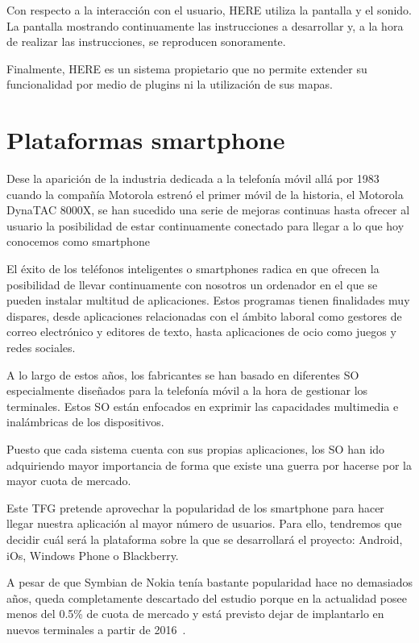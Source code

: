 \begin{definitionlist}
    Con respecto a la interacción con el usuario, HERE utiliza la pantalla y el sonido. La
    pantalla mostrando continuamente las instrucciones a desarrollar y, a la hora de realizar
    las instrucciones, se reproducen sonoramente.

    Finalmente, HERE es un sistema propietario que no permite extender su funcionalidad por medio de
    plugins ni la utilización de sus mapas.

\end{definitionlist}

\section{Plataformas smartphone}

Dese la aparición de la industria dedicada a la telefonía móvil allá por 1983 cuando la compañía
Motorola estrenó el primer móvil de la historia, el Motorola DynaTAC 8000X, se han sucedido una
serie de mejoras continuas hasta ofrecer al usuario la posibilidad de estar continuamente conectado
para llegar a lo que hoy conocemos como smartphone

El éxito de los teléfonos inteligentes o smartphones radica en que ofrecen la posibilidad de llevar
continuamente con nosotros un ordenador en el que se pueden instalar multitud de aplicaciones. Estos
programas tienen finalidades muy dispares, desde aplicaciones relacionadas con el ámbito laboral
como gestores de correo electrónico y editores de texto, hasta aplicaciones de ocio como juegos y
redes sociales.

A lo largo de estos años, los fabricantes se han basado en diferentes \acf{SO} especialmente
diseñados para la telefonía móvil a la hora de gestionar los terminales. Estos \acs{SO} están
enfocados en exprimir las capacidades multimedia e inalámbricas de los dispositivos.

Puesto que cada sistema cuenta con sus propias aplicaciones, los \acs{SO} han ido adquiriendo mayor
importancia de forma que existe una guerra por hacerse por la mayor cuota de mercado.

Este \acs{TFG} pretende aprovechar la popularidad de los smartphone para hacer llegar nuestra
aplicación al mayor número de usuarios. Para ello, tendremos que decidir cuál será la plataforma
sobre la que se desarrollará el proyecto: Android, iOs, Windows Phone o Blackberry.

A pesar de que Symbian de Nokia tenía bastante popularidad hace no demasiados años, queda
completamente descartado del estudio porque en la actualidad posee menos del 0.5\% de cuota de
mercado y está previsto dejar de implantarlo en nuevos terminales a partir de
2016~\cite{Litchfield13}.

